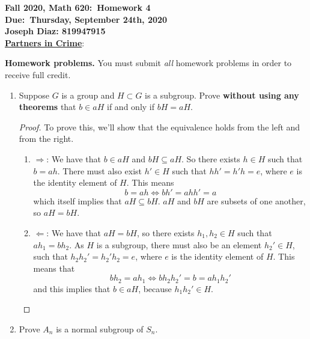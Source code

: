\documentclass{article}
\newcommand{\be}{\begin{enumerate}}
\newcommand{\ee}{\end{enumerate}}
\begin{document}
	\begin{center}
		\textbf{Fall 2020, Math 620:\ Homework 4} \\
		\textbf{Due:\ Thursday, September 24th, 2020} \\
		\textbf{Joseph Diaz: 819947915}\\
		\underline{\textbf{Partners in Crime}}:\\
		


\end{center}
\bigskip
\noindent
\textbf{Homework problems.}
You must submit \emph{all} homework problems in order to receive full 
credit.  
\noindent\makebox[\linewidth]{\rule{\paperwidth}{0.4pt}}
\begin{enumerate}[(H1)]
\item 
Suppose $G$ is a group and $H \subset G$ is a subgroup.  Prove 
\textbf{without using any theorems} that $b \in aH$ if and only if 
$bH = aH$.  

\begin{proof}
To prove this, we'll show that the equivalence holds from the
left and from the right.
\be
    \item[$\Longrightarrow$:] We have that $b \in aH$ and $bH 
    \subseteq 
    aH$. So there exists $h \in H$ such that $b = ah$. 
    There must also exist $h' \in H$ such that $hh' = h'h = e$, where
    $e$ is the identity element of $H$. This means
    $$b = ah \iff bh' = ahh' = a$$
    which itself implies that $aH \subseteq bH$. $aH$ and $bH$ are 
    subsets of one another, so $aH = bH$.
    
    \item[$\Longleftarrow$:] We have that $aH = bH$, so there exists
    $h_1, h_2 \in H$ such that $ah_1 = bh_2$. As $H$ is a subgroup,
    there must also be an element $h_2' \in H$, such that $h_2h_2'
    = h_2'h_2 = e$, where $e$ is the identity element of $H$. This
    means that 
    $$bh_2 = ah_1 \iff bh_2h_2' = b = ah_1h_2'$$
    and this implies that $b \in aH$, because $h_1h_2' \in H$.
    
\ee 
\end{proof}


\item 
Prove $A_n$ is a normal subgroup of $S_n$.  


\end{enumerate}
\end{document}
